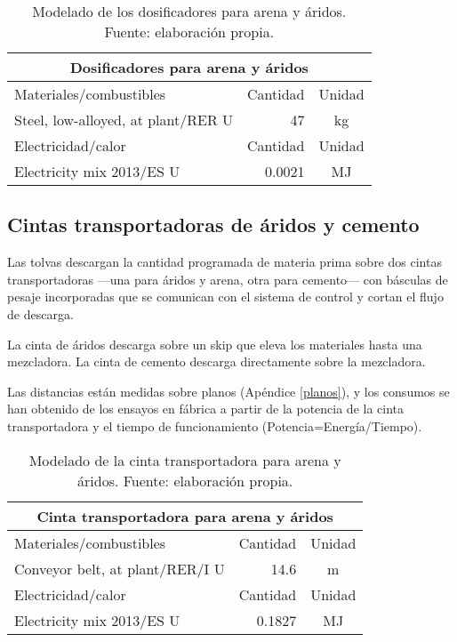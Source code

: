 \begin{table}[!htb]
\centering
\begin{tabular}{p{8cm}rc}
\toprule
\multicolumn{3}{c}{Dosificadores para arena y áridos}\\
\midrule
Materiales/combustibles & Cantidad & Unidad\\
\midrule
Steel, low-alloyed, at plant/RER U & 47 & \si{kg}\\
\midrule
Electricidad/calor & Cantidad & Unidad\\
\midrule
Electricity mix 2013/ES U & 0.0021 & \si{MJ}\\
\bottomrule
\end{tabular}
\caption[Modelado de los dosificadores para arena y áridos.]{Modelado de los dosificadores para arena y áridos. Fuente: elaboración propia.}
\label{modeladodedosificadores}
\end{table}

\subsection{Cintas transportadoras de áridos y cemento}

Las tolvas descargan la cantidad programada de materia prima sobre dos cintas transportadoras —una para áridos y arena, otra para cemento— con básculas de pesaje incorporadas que se comunican con el sistema de control y cortan el flujo de descarga.

La cinta de áridos descarga sobre un skip que eleva los materiales hasta una mezcladora. La cinta de cemento descarga directamente sobre la mezcladora.

Las distancias están medidas sobre planos (Apéndice \ref{planos}), y los consumos se han obtenido de los ensayos en fábrica a partir de la potencia de la cinta transportadora y el tiempo de funcionamiento (Potencia=Energía/Tiempo).

\begin{table}[!htb]
\centering
\begin{tabular}{p{8cm}rc}
\toprule
\multicolumn{3}{c}{Cinta transportadora para arena y áridos}\\
\midrule
Materiales/combustibles & Cantidad & Unidad\\
\midrule
Conveyor belt, at plant/RER/I U & 14.6 & \si{m}\\
\midrule
Electricidad/calor & Cantidad & Unidad\\
\midrule
Electricity mix 2013/ES U & 0.1827 & \si{MJ}\\
\bottomrule
\end{tabular}
\caption[Modelado de la cinta transportadora para arena y áridos.]{Modelado de la cinta transportadora para arena y áridos. Fuente: elaboración propia.}
\label{modeladodecintaarena}
\end{table}

